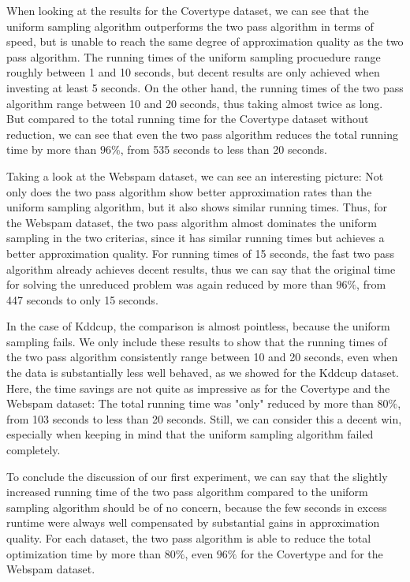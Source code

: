 When looking at the results for the Covertype dataset, we can see
that the uniform sampling algorithm outperforms the two pass
algorithm in terms of speed, but is unable to reach the same degree
of approximation quality as the two pass algorithm. The running times of
the uniform sampling procuedure range roughly between 1 and
10 seconds, but decent results are only achieved when investing
at least 5 seconds. On the other hand, the running times of the
two pass algorithm range between 10 and 20 seconds, thus taking
almost twice as long. But compared to the total running time
for the Covertype dataset without reduction, we can see that
even the two pass algorithm reduces the total running time
by more than $96\%$, from 535 seconds to less than 20 seconds.

Taking a look at the Webspam dataset, we can see an interesting
picture: Not only does the two pass algorithm show better
approximation rates than the uniform sampling algorithm, but
it also shows similar running times. Thus, for the Webspam dataset,
the two pass algorithm almost dominates the uniform sampling
in the two criterias, since it has similar running times but
achieves a better approximation quality.
For running times of 15 seconds, the fast two pass algorithm already
achieves decent results, thus we can say that the
original time for solving the unreduced problem was again reduced
by more than $96\%$, from 447 seconds to only 15 seconds.

In the case of Kddcup, the comparison is almost pointless, because
the uniform sampling fails. We only include these results to show
that the running times of the two pass algorithm consistently
range between 10 and 20 seconds, even when the data is
substantially less well behaved, as we showed for the
Kddcup dataset. Here, the time savings are not quite as impressive
as for the Covertype and the Webspam dataset:
The total running time was "only" reduced by more than $80\%$,
from 103 seconds to less than 20 seconds. Still, we can
consider this a decent win, especially when keeping
in mind that the uniform sampling algorithm failed completely.

To conclude the discussion of our first experiment, we can
say that the slightly increased running time of the two
pass algorithm compared to the uniform sampling algorithm
should be of no concern, because the few seconds in excess
runtime were always well compensated by substantial
gains in approximation quality. For each dataset,
the two pass algorithm is able to reduce the total
optimization time by more than $80\%$, even $96\%$ for
the Covertype and for the Webspam dataset.


